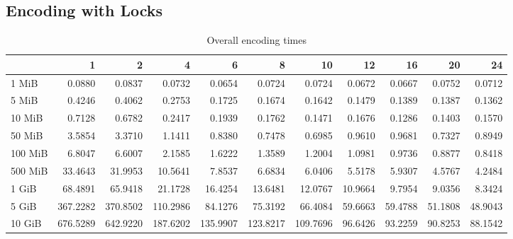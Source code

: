 \subsection{Encoding with Locks}
\begin{table}[!h]
	\caption{Overall encoding times}
	\begin{tabular}{lrrrrrrrrrr}
		\toprule
		{} &        1  &        2  &        4  &        6  &        8  &        10 &       12 &       16 &       20 &       24 \\
		\midrule
		1 MiB   &    0.0880 &    0.0837 &    0.0732 &    0.0654 &    0.0724 &    0.0724 &   0.0672 &   0.0667 &   0.0752 &   0.0712 \\
		5 MiB   &    0.4246 &    0.4062 &    0.2753 &    0.1725 &    0.1674 &    0.1642 &   0.1479 &   0.1389 &   0.1387 &   0.1362 \\
		10 MiB  &    0.7128 &    0.6782 &    0.2417 &    0.1939 &    0.1762 &    0.1471 &   0.1676 &   0.1286 &   0.1403 &   0.1570 \\
		50 MiB  &    3.5854 &    3.3710 &    1.1411 &    0.8380 &    0.7478 &    0.6985 &   0.9610 &   0.9681 &   0.7327 &   0.8949 \\
		100 MiB &    6.8047 &    6.6007 &    2.1585 &    1.6222 &    1.3589 &    1.2004 &   1.0981 &   0.9736 &   0.8877 &   0.8418 \\
		500 MiB &   33.4643 &   31.9953 &   10.5641 &    7.8537 &    6.6834 &    6.0406 &   5.5178 &   5.9307 &   4.5767 &   4.2484 \\
		1 GiB   &   68.4891 &   65.9418 &   21.1728 &   16.4254 &   13.6481 &   12.0767 &  10.9664 &   9.7954 &   9.0356 &   8.3424 \\
		5 GiB   &  367.2282 &  370.8502 &  110.2986 &   84.1276 &   75.3192 &   66.4084 &  59.6663 &  59.4788 &  51.1808 &  48.9043 \\
		10 GiB  &  676.5289 &  642.9220 &  187.6202 &  135.9907 &  123.8217 &  109.7696 &  96.6426 &  93.2259 &  90.8253 &  88.1542 \\
		\bottomrule
	\end{tabular}
	
\end{table}
